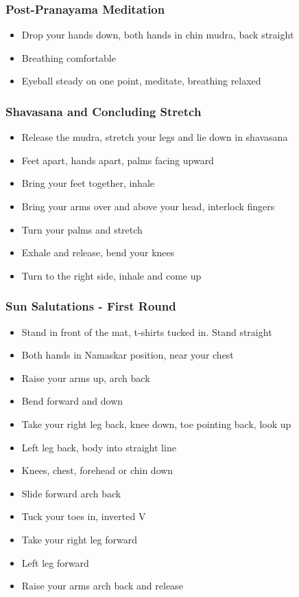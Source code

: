 \begin{frame}[fragile]\frametitle{Post-Pranayama Meditation}
\begin{itemize}
    \item Drop your hands down, both hands in chin mudra, back straight
    \item Breathing comfortable
    \item Eyeball steady on one point, meditate, breathing relaxed
\end{itemize}
\end{frame}

\begin{frame}[fragile]\frametitle{Shavasana and Concluding Stretch}
\begin{itemize}
    \item Release the mudra, stretch your legs and lie down in shavasana
    \item Feet apart, hands apart, palms facing upward
    \item Bring your feet together, inhale
    \item Bring your arms over and above your head, interlock fingers
    \item Turn your palms and stretch
    \item Exhale and release, bend your knees
    \item Turn to the right side, inhale and come up
\end{itemize}
\end{frame}

\begin{frame}[fragile]\frametitle{Sun Salutations - First Round}
\begin{itemize}
    \item Stand in front of the mat, t-shirts tucked in. Stand straight
    \item Both hands in Namaskar position, near your chest
    \item Raise your arms up, arch back
    \item Bend forward and down
    \item Take your right leg back, knee down, toe pointing back, look up
    \item Left leg back, body into straight line
    \item Knees, chest, forehead or chin down
    \item Slide forward arch back
    \item Tuck your toes in, inverted V
    \item Take your right leg forward
    \item Left leg forward
    \item Raise your arms arch back and release
\end{itemize}
\end{frame}

